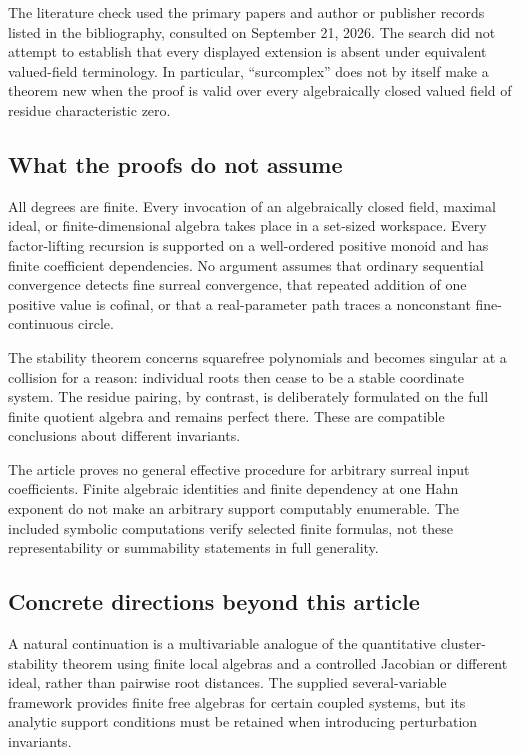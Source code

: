 \documentclass[11pt,letterpaper]{article}
\numberwithin{equation}{section}
\theoremstyle{definition}
\theoremstyle{remark}
\begin{document}
The literature check used the primary papers and author or publisher
records listed in the bibliography, consulted on September 21, 2026.
The search did not attempt to establish that every displayed extension
is absent under equivalent valued-field terminology. In particular,
``surcomplex'' does not by itself make a theorem new when the proof is
valid over every algebraically closed valued field of residue
characteristic zero.

\subsection{What the proofs do not assume}
All degrees are finite. Every invocation of an algebraically closed field,
maximal ideal, or finite-dimensional algebra takes place in a set-sized
workspace. Every factor-lifting recursion is supported on a well-ordered
positive monoid and has finite coefficient dependencies. No argument
assumes that ordinary sequential convergence detects fine surreal
convergence, that repeated addition of one positive value is cofinal, or
that a real-parameter path traces a nonconstant fine-continuous circle.

The stability theorem concerns squarefree polynomials and becomes singular
at a collision for a reason: individual roots then cease to be a stable
coordinate system. The residue pairing, by contrast, is deliberately
formulated on the full finite quotient algebra and remains perfect there.
These are compatible conclusions about different invariants.

The article proves no general effective procedure for arbitrary surreal
input coefficients. Finite algebraic identities and finite dependency at
one Hahn exponent do not make an arbitrary support computably enumerable.
The included symbolic computations verify selected finite formulas, not
these representability or summability statements in full generality.

\subsection{Concrete directions beyond this article}
A natural continuation is a multivariable analogue of the quantitative
cluster-stability theorem using finite local algebras and a controlled
Jacobian or different ideal, rather than pairwise root distances.
The supplied several-variable framework provides finite free algebras
for certain coupled systems, but its analytic support conditions must be
retained when introducing perturbation invariants.
\end{document}
